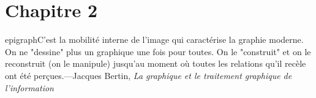
\chapter{Chapitre 2}
\label{ch-2}

epigraph{C'est la mobilité interne de l'image qui caractérise la graphie moderne. On ne "dessine" plus un graphique une fois pour toutes. On le "construit" et on le reconstruit (on le manipule) jusqu'au moment où toutes les relations qu'il recèle ont été perçues.}{---Jacques Bertin, \textit{La graphique et le traitement graphique de l'information}}

\lipsum[2-4]

